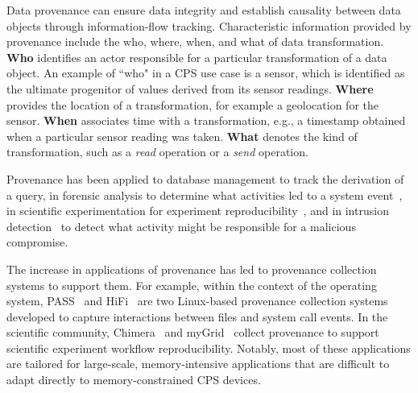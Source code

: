 Data provenance can ensure data integrity \cite{Bertino2015} and establish causality between data objects through information-flow tracking.
Characteristic information provided by provenance include the who, where, when, and what of data transformation. \textbf{Who} identifies an actor responsible for a particular transformation of a data object. An example of ``who" in a CPS use case is a sensor, which is identified as the ultimate progenitor of values derived from its sensor readings. \textbf{Where} provides the location of a transformation, for example a geolocation for the sensor. \textbf{When} associates time with a transformation, e.g., a timestamp obtained when a particular sensor reading was taken. \textbf{What} denotes the kind of transformation, such as a {\em read} operation or a {\em send} operation.

Provenance has been applied to database management to track the derivation of a query, in forensic analysis to determine what activities led to a system event~\cite{Bates2014LetSB, Lu:2010:SPE:1755688.1755723, 6542529}, in scientific experimentation for experiment reproducibility~\cite{chimera, Davidson:2008:PSW:1376616.1376772, altintas, Oinn2004TavernaAT}, and in intrusion detection~\cite{Xie_yulani, Fadolalkarim, 203308} to detect what activity might be responsible for a malicious compromise.

The increase in applications of provenance has led to provenance collection systems to support them. For example, within the context of the operating system, PASS~\cite{muniswamy_reddy} and HiFi~\cite{hi_fi} are two Linux-based provenance collection systems developed to capture interactions between files and system call events. In the scientific community, Chimera~\cite{chimera} and myGrid~\cite{Oinn2004TavernaAT} collect provenance to support scientific experiment workflow reproducibility. Notably, most of these applications are tailored for large-scale, memory-intensive applications that are difficult to adapt directly to memory-constrained CPS devices.





